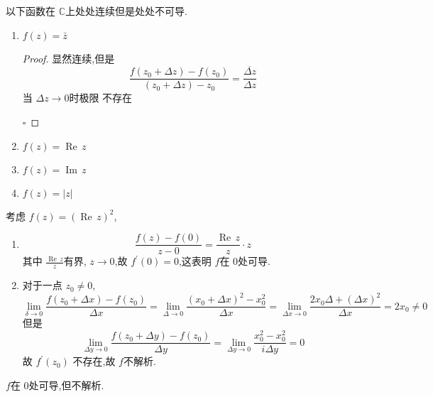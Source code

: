 \documentclass[../../复变函数.tex]{subfiles}
\begin{document}
\begin{example}[  处处连续单处处不可导的复函数]
    以下函数在 \(  \mathbb{C}   \)上处处连续但是处处不可导. 
    \begin{enumerate}
        \item \(  f\left( z \right) = \bar{z}   \) 
        \begin{proof}
            显然连续,但是 \[
             \frac{f\left( z_0+  \Delta z \right)-f\left( z_0 \right)   }{\left( z_0+  \Delta z \right)-z_0  } =  \frac{\overline{ \Delta z} }{ \Delta z }  
            \]当 \(   \Delta z\to 0  \)时极限 不存在
        
            \hfill $\square$
        \end{proof}
        \item \(  f\left( z \right)=  \operatorname{Re}\,z   \)
        \item \(  f\left( z \right)= \operatorname{Im}\,z   \)
        \item \(  f\left( z \right)=  \left| z \right|    \)   
    \end{enumerate}
    
\end{example}

\hspace*{\fill} 

\begin{example}[  在一点可导但不解析的函数]
    考虑 \(  f\left( z \right)=   \left( \operatorname{Re}\,z \right)^{2}  \), 
    \begin{enumerate}
       \item \[
       \frac{f\left( z \right)-f\left( 0 \right)   }{z-0 } =  \frac{\operatorname{Re}\,z }{z } \cdot z  
       \]其中 \(  \frac{\operatorname{Re}\,z }{z }   \)有界, \(  z\to 0  \),故 \(  f^{\prime} \left( 0 \right)= 0   \),这表明 \(  f  \)在 \(  0  \)处可导.     
     \item 对于一点 \(  z_0 \neq 0  \),   \[
         \lim_{ \delta  \to 0} \frac{f\left( z_0+  \Delta x \right)-f\left( z_0 \right)   }{ \Delta x } = \lim_{ \Delta  \to 0} \frac{\left( x_0+  \Delta x \right)^{2}  -x_0^{2}}{ \Delta x }=  \lim_{ \Delta  x\to 0} \frac{2x_0 \Delta + \left(  \Delta x \right)^{2}  }{ \Delta x } =  2x_0\neq 0  
         \]
         但是 \[
         \lim_{ \Delta y \to 0} \frac{f\left( z_0+  \Delta y \right)-f\left( z_0 \right)    }{ \Delta y } =  \lim_{ \Delta y \to 0} \frac{x_0^{2}-x_0^{2} }{ i\Delta y }= 0  
         \]故 \(  f^{\prime} \left( z_0 \right)   \) 不存在,故 \(  f  \)不解析. 
    \end{enumerate}
      \(  f  \)在 \(  0  \)处可导,但不解析.  
     
\end{example}
\end{document}
